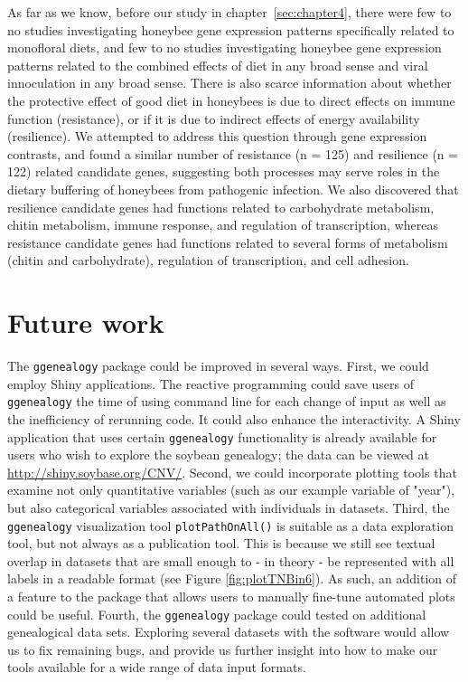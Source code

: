 \documentclass[11pt,a4paper,oldfontcommands,openany]{memoir}
\numberwithin{equation}{section} %
\newcommand{\code}[1]{{\texttt{#1}}}
\newcommand{\pkg}[1]{{\texttt{#1}}}
\begin{document}
As far as we know, before our study in chapter~\ref{sec:chapter4}, there were few to no studies investigating honeybee gene expression patterns specifically related to monofloral diets, and few to no studies investigating honeybee gene expression patterns related to the combined effects of diet in any broad sense and viral innoculation in any broad sense. There is also scarce information about whether the protective effect of good diet in honeybees is due to direct effects on immune function (resistance), or if it is due to indirect effects of energy availability (resilience). We attempted to address this question through gene expression contrasts, and found a similar number of resistance (n = 125) and resilience (n = 122) related candidate genes, suggesting both processes may serve roles in the dietary buffering of honeybees from pathogenic infection. We also discovered that resilience candidate genes had functions related to carbohydrate metabolism, chitin metabolism, immune response, and regulation of transcription, whereas resistance candidate genes had functions related to several forms of metabolism (chitin and carbohydrate), regulation of transcription, and cell adhesion.

\section{Future work}

The \pkg{ggenealogy} package could be improved in several ways. First, we could employ Shiny applications. The reactive programming could save users of \pkg{ggenealogy} the time of using command line for each change of input as well as the inefficiency of rerunning code. It could also enhance the interactivity. A Shiny application that uses certain \pkg{ggenealogy} functionality is already available for users who wish to explore the soybean genealogy; the data can be viewed at \url{http://shiny.soybase.org/CNV/}. Second, we could incorporate plotting tools that examine not only quantitative variables (such as our example variable of "year"), but also categorical variables associated with individuals in datasets. Third, the \pkg{ggenealogy} visualization tool \code{plotPathOnAll()} is suitable as a data exploration tool, but not always as a publication tool. This is because we still see textual overlap in datasets that are small enough to - in theory - be represented with all labels in a readable format (see Figure \ref{fig:plotTNBin6}). As such, an addition of a feature to the package that allows users to manually fine-tune automated plots could be useful. Fourth, the \pkg{ggenealogy} package could tested on additional genealogical data sets. Exploring several datasets with the software would allow us to fix remaining bugs, and provide us further insight into how to make our tools available for a wide range of data input formats. 
\end{document}
